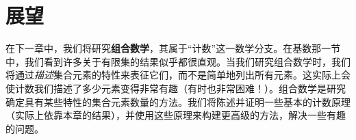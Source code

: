\section{展望}

在下一章中，我们将研究\textbf{组合数学}，其属于``计数''这一数学分支。在基数那一节中，我们看到许多关于有限集的结果似乎都很直观。当我们研究组合数学时，我们将通过\emph{描述}集合元素的特性来表征它们，而不是简单地列出所有元素。这实际上会使计数我们描述了多少元素变得非常有趣（有时也非常困难！）。组合数学是研究确定具有某些特性的集合元素数量的方法。我们将陈述并证明一些基本的计数原理（实际上依靠本章的结果），并使用这些原理来构建更高级的方法，解决一些有趣的问题。